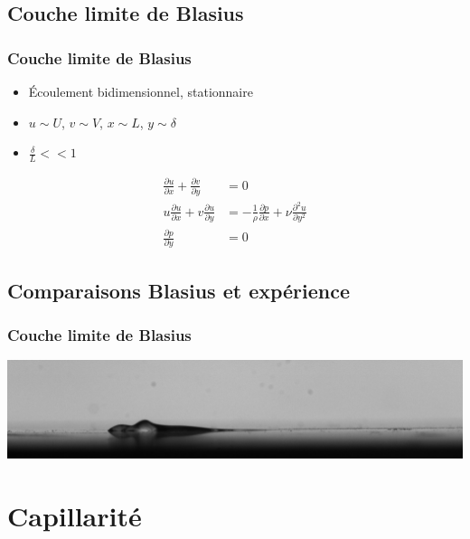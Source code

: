 \documentclass{beamer}
\begin{document}
\subsection{Couche limite de Blasius}\label{sub:Blasius}
\begin{frame}
\frametitle{Couche limite de Blasius}
\begin{itemize}
\item Écoulement bidimensionnel, stationnaire
\item $u \sim U$, $v \sim V$, $x \sim L$, $y \sim \delta$
\item $\frac{\delta}{L} << 1$
\end{itemize}
\begin{align}	
	\frac{\partial u}{\partial x} 
	+
	\frac{\partial v}{\partial y} 
	&= 0 \\
	u\frac{\partial u}{\partial x} + 
	v\frac{\partial u}{\partial y} 
	&= - \frac{1}{\rho}
	\frac{\partial p}{\partial  x} +
	\nu
	\frac{\partial^{2} u}{\partial  y^{2}} \\
	\frac{\partial p}{\partial y} 
	&= 0
\end{align}
\end{frame}

\subsection{Comparaisons Blasius et expérience}\label{sec:comparaison}
\begin{frame}
\frametitle{Couche limite de Blasius}
\begin{center}
\includegraphics[height=0.2\linewidth]{./image/test628.jpg} \\ 
\end{center}
\end{frame}


\section{Capillarité}\label{sec:couche}
\end{document}

